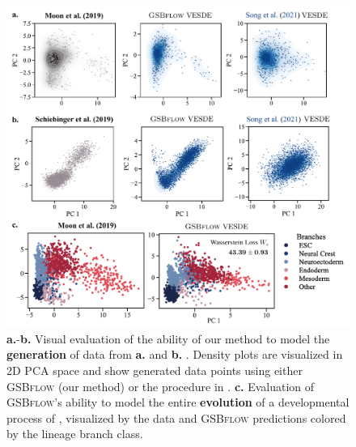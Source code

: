 \begin{figure}[ht]
     \centering
     \includegraphics[width=\textwidth]{figures/fig_all_predictions.pdf}
    \caption{\textbf{a.}-\textbf{b.} Visual evaluation of the ability of our method to model the \textbf{generation} of data from \textbf{a.} \citet{moon2019visualizing} and \textbf{b.} \citet{schiebinger2019optimal}. Density plots are visualized in 2D \acrshort{PCA} space and show generated data points using either \textsc{GSBflow} (our method) or the procedure in \citet{song2020score}. \textbf{c.} Evaluation of \textsc{GSBflow}'s ability to model the entire \textbf{evolution} of a developmental process of \citet{moon2019visualizing}, visualized by the data and \textsc{GSBflow} predictions colored by the lineage branch class.}
    \label{fig:all_results}
\end{figure}


